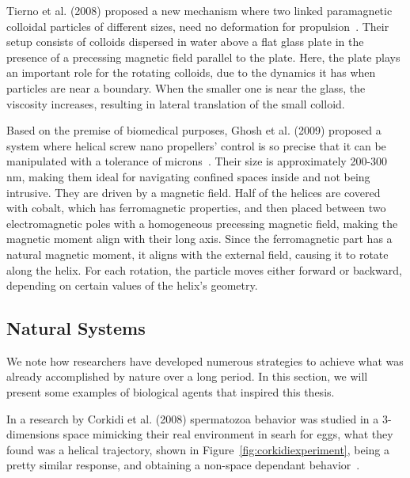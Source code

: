 Tierno et al. (2008) proposed a new mechanism where two linked paramagnetic colloidal particles of different sizes, need no deformation for propulsion~\cite{tierno2008controlled}. Their setup consists of colloids dispersed in water above a flat glass plate in the presence of a precessing magnetic field parallel to the plate. Here, the plate plays an important role for the rotating colloids, due to the dynamics it has when particles are near a boundary. When the smaller one is near the glass, the viscosity increases, resulting in lateral translation of the small colloid.


Based on the premise of biomedical purposes, Ghosh et al. (2009) proposed a system where helical screw nano propellers' control is so precise that it can be manipulated with a tolerance of microns~\cite{ghosh2009controlled}. Their size is approximately 200-300 nm, making them ideal for navigating confined spaces inside and not being intrusive. They are driven by a magnetic field. Half of the helices are covered with cobalt, which has ferromagnetic properties, and then placed between two electromagnetic poles with a homogeneous precessing magnetic field, making the magnetic moment align with their long axis. Since the ferromagnetic part has a natural magnetic moment, it aligns with the external field, causing it to rotate along the helix. For each rotation, the particle moves either forward or backward, depending on certain values of the helix's geometry. 

\subsection{Natural Systems}

We note how researchers have developed numerous strategies to achieve what was already accomplished by nature over a long period. In this section, we will present some examples of biological agents that inspired this thesis.

 In a research by Corkidi et al. (2008) spermatozoa behavior was studied in a 3-dimensions space mimicking their real environment in searh for eggs, what they found was a helical trajectory, shown in Figure~\ref{fig:corkidiexperiment}, being a pretty similar response, and obtaining a non-space dependant behavior~\cite{corkidi2008tracking}. 

